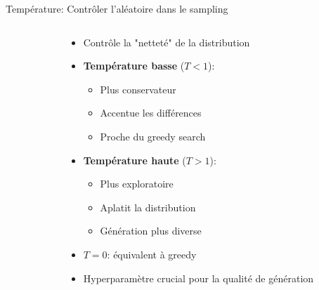 \documentclass[aspectratio=169]{beamer}
\begin{document}
\begin{frame}{Température: Contrôler l'aléatoire dans le sampling}
\begin{columns}
\begin{column}{0.6\textwidth}
\begin{center}
            \end{center}
        \end{column}
        \begin{column}{0.4\textwidth}
            \begin{itemize}
                \item Contrôle la "netteté" de la distribution
                \item \textbf{Température basse} ($T < 1$):
                \begin{itemize}
                    \item Plus conservateur
                    \item Accentue les différences
                    \item Proche du greedy search
                \end{itemize}
                \item \textbf{Température haute} ($T > 1$):
                \begin{itemize}
                    \item Plus exploratoire
                    \item Aplatit la distribution
                    \item Génération plus diverse
                \end{itemize}
                \item $T = 0$: équivalent à greedy
                \item Hyperparamètre crucial pour la qualité de génération
            \end{itemize}
        \end{column}
    \end{columns}
\end{frame}
\end{document}

